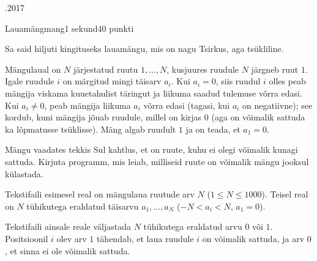 \documentclass[a4paper,11pt]{article}
\begin{document}
\begin{ol}{\eio}{.2017}{\yle}{}
\begin{yl}{3}{Lauamäng}{mang}{1 sekund}{40 punkti}

Sa said hiljuti kingituseks lauamängu, mis on nagu Tsirkus, aga tsükliline.

Mängulaual on $N$ järjestatud ruutu $1, \ldots, N$, kusjuures ruudule $N$ järgneb ruut $1$. Igale ruudule $i$ on märgitud mingi täisarv $a_i$. Kui $a_i = 0$, siis ruudul $i$ olles peab mängija viskama kuuetahulist täringut ja liikuma saadud tulemuse võrra edasi. Kui $a_i \ne 0$, peab mängija liikuma $a_i$ võrra edasi (tagasi, kui $a_i$ on negatiivne); see kordub, kuni mängija jõuab ruudule, millel on kirjas $0$ (aga on võimalik sattuda ka lõpmatusse tsüklisse). Mäng algab ruudult $1$ ja on teada, et $a_1 = 0$.

Mängu vaadates tekkis Sul kahtlus, et on ruute, kuhu ei olegi võimalik kunagi sattuda. Kirjuta programm, mis leiab, milliseid ruute on võimalik mängu jooksul külastada.

\sis Tekstifaili \sisf esimesel real on mängulaua ruutude arv $N$ ($1 \le N \le 1000$).
Teisel real on $N$ tühikutega eraldatud täisarvu $a_1, \ldots, a_N$ ($-N < a_i < N$, $a_1 = 0$).

\val Tekstifaili \valf ainsale reale väljastada $N$ tühikutega eraldatud arvu $0$ või $1$. Positsioonil $i$ olev arv $1$ tähendab, et laua ruudule $i$ on võimalik sattuda, ja arv $0$, et sinna ei ole võimalik sattuda.

\nde[0]{5cm}{5cm}

\nde[1]{5cm}{5cm}

\end{yl}
\end{ol}
\end{document}
